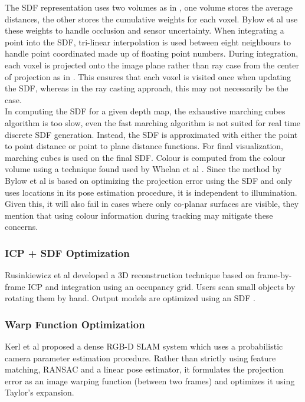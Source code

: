The SDF representation uses two volumes as in \cite{Curless96Volumetric}, one volume stores the average distances, the other stores the cumulative weights for each voxel. Bylow et al use these weights to handle occlusion and sensor uncertainty. When integrating a point into the SDF, tri-linear interpolation is used between eight neighbours to handle point coordinated made up of floating point numbers. During integration, each voxel is projected onto the image plane rather than ray case from the center of projection as in \cite{Newcombe11Kinectfusion}. This ensures that each voxel is visited once when updating the SDF, whereas in the ray casting approach, this may not necessarily be the case. \\

In computing the SDF for a given depth map, the exhaustive marching cubes algorithm is too slow, even the fast marching algorithm \cite{Baerentzen01Implementation} is not suited for real time discrete SDF generation. Instead, the SDF is approximated with either the point to point distance or point to plane distance functions. For final visualization, marching cubes is used \cite{Lorensen87Marching} on the final SDF. Colour is computed from the colour volume using a technique found used by Whelan et al \cite{Whelan13Robust}. Since the method by Bylow et al is based on optimizing the projection error using the SDF and only uses locations in its pose estimation procedure, it is independent to illumination. Given this, it will also fail in cases where only co-planar surfaces are visible, they mention that using colour information during tracking \cite{Kerl13Robust} may mitigate these concerns.

\subsubsection{ICP + SDF Optimization}

Rusinkiewicz et al \cite{Rusinkiewicz02Real} developed a 3D reconstruction technique based on frame-by-frame ICP and integration using an occupancy grid. Users scan small objects by rotating them by hand. Output models are optimized using an SDF \cite{Curless96Volumetric}.


\subsubsection{Warp Function Optimization} 

Kerl et al \cite{Kerl13Dense} proposed a dense RGB-D SLAM system which uses a probabilistic camera parameter estimation procedure. Rather than strictly using feature matching, RANSAC and a linear pose estimator, it formulates the projection error as an image warping function (between two frames) and optimizes it using Taylor's expansion.


